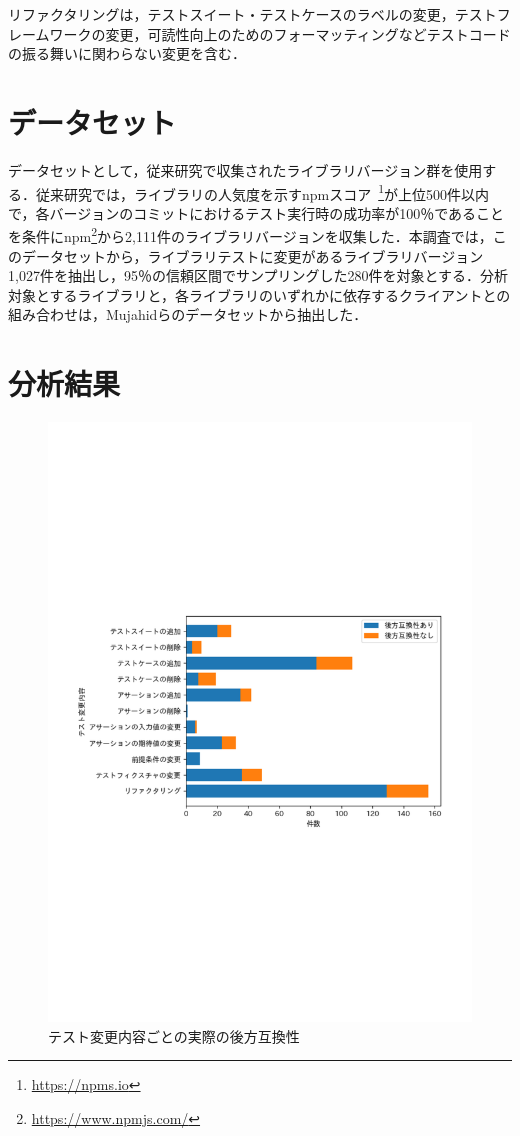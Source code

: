 \documentclass[11pt,dvipdfmx]{jreport}
\begin{document}
リファクタリングは，テストスイート・テストケースのラベルの変更，テストフレームワークの変更，可読性向上のためのフォーマッティングなどテストコードの振る舞いに関わらない変更を含む．

\section{データセット}\label{rq1:datasets}
データセットとして，従来研究\cite{matsuda}で収集されたライブラリバージョン群を使用する．従来研究では，ライブラリの人気度を示すnpmスコア~\footnote{\url{https://npms.io}}が上位500件以内で，各バージョンのコミットにおけるテスト実行時の成功率が100％であることを条件にnpm\footnote{\url{https://www.npmjs.com/}}から2,111件のライブラリバージョンを収集した．本調査では，このデータセットから，ライブラリテストに変更があるライブラリバージョン1,027件を抽出し，95％の信頼区間でサンプリングした280件を対象とする．分析対象とするライブラリと，各ライブラリのいずれかに依存するクライアントとの組み合わせは，Mujahidらのデータセットから抽出した．

\section{分析結果}\label{seq:rq1-result}

\begin{figure}[t]
  \centering
  \includegraphics[width=1.0\linewidth]{fig/barh-test-pattern.pdf}
  \caption{テスト変更内容ごとの実際の後方互換性}
  \label{fig:test_pattern}
\end{figure}
\end{document}
